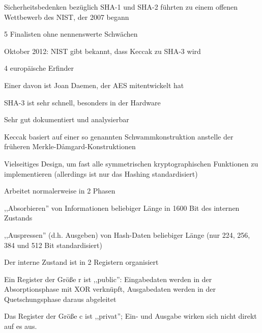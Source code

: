 \documentclass[a4paper]{article}
\begin{document}
\begin{multicols}{3}
      \begin{itemize*}
            \item Sicherheitsbedenken bezüglich SHA-1 und SHA-2 führten zu einem offenen
            Wettbewerb des NIST, der 2007 begann
            \begin{itemize*}
                  \item 5 Finalisten ohne nennenswerte Schwächen
                  \item Oktober 2012: NIST gibt bekannt, dass Keccak zu SHA-3 wird
                  \item 4 europäische Erfinder
                  \item Einer davon ist Joan Daemen, der AES mitentwickelt hat
                  \item SHA-3 ist sehr schnell, besonders in der Hardware
                  \item Sehr gut dokumentiert und analysierbar
            \end{itemize*}
            \item Keccak basiert auf einer so genannten Schwammkonstruktion anstelle der
            früheren Merkle-Dåmgard-Konstruktionen
            \begin{itemize*}
                  \item Vielseitiges Design, um fast alle symmetrischen kryptographischen Funktionen zu implementieren (allerdings ist nur das Hashing standardisiert)
            \end{itemize*}
            \item Arbeitet normalerweise in 2 Phasen
            \begin{itemize*}
                  \item ,,Absorbieren'' von Informationen beliebiger Länge in 1600 Bit des internen Zustands
                  \item ,,Auspressen'' (d.h. Ausgeben) von Hash-Daten beliebiger Länge (nur 224, 256, 384 und 512 Bit standardisiert)
            \end{itemize*}
            \item Der interne Zustand ist in 2 Registern organisiert
            \begin{itemize*}
                  \item Ein Register der Größe r ist ,,public'': Eingabedaten werden in der Absorptionsphase mit XOR verknüpft, Ausgabedaten werden in der Quetschungsphase daraus abgeleitet
                  \item Das Register der Größe c ist ,,privat''; Ein- und Ausgabe wirken sich nicht direkt auf es aus.

\end{itemize*}
\end{itemize*}
\end{multicols}
\end{document}
